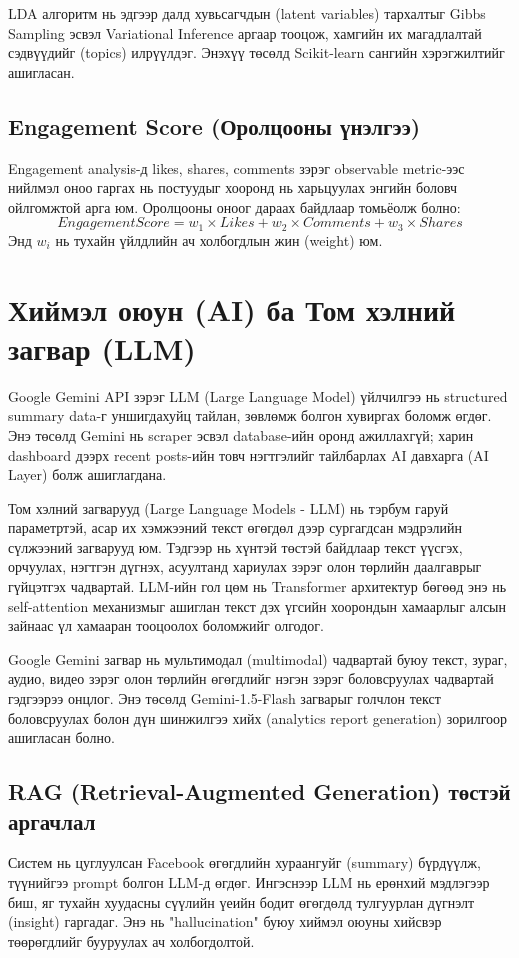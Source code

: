 LDA алгоритм нь эдгээр далд хувьсагчдын (latent variables) тархалтыг Gibbs Sampling эсвэл Variational Inference аргаар тооцож, хамгийн их магадлалтай сэдвүүдийг (topics) илрүүлдэг. Энэхүү төсөлд Scikit-learn сангийн хэрэгжилтийг ашигласан.

\subsection{Engagement Score (Оролцооны үнэлгээ)}
Engagement analysis-д likes, shares, comments зэрэг observable metric-ээс нийлмэл оноо гаргах нь постуудыг хооронд нь харьцуулах энгийн боловч ойлгомжтой арга юм. Оролцооны оноог дараах байдлаар томьёолж болно:
$$ Engagement Score = w_1 \times Likes + w_2 \times Comments + w_3 \times Shares $$
Энд $w_i$ нь тухайн үйлдлийн ач холбогдлын жин (weight) юм.

\section{Хиймэл оюун (AI) ба Том хэлний загвар (LLM)}

Google Gemini API зэрэг LLM (Large Language Model) үйлчилгээ нь structured summary data-г уншигдахуйц тайлан, зөвлөмж болгон хувиргах боломж өгдөг. Энэ төсөлд Gemini нь scraper эсвэл database-ийн оронд ажиллахгүй; харин dashboard дээрх recent posts-ийн товч нэгтгэлийг тайлбарлах AI давхарга (AI Layer) болж ашиглагдана.

Том хэлний загварууд (Large Language Models - LLM) нь тэрбум гаруй параметртэй, асар их хэмжээний текст өгөгдөл дээр сургагдсан мэдрэлийн сүлжээний загварууд юм. Тэдгээр нь хүнтэй төстэй байдлаар текст үүсгэх, орчуулах, нэгтгэн дүгнэх, асуултанд хариулах зэрэг олон төрлийн даалгаврыг гүйцэтгэх чадвартай. LLM-ийн гол цөм нь Transformer архитектур бөгөөд энэ нь self-attention механизмыг ашиглан текст дэх үгсийн хоорондын хамаарлыг алсын зайнаас үл хамааран тооцоолох боломжийг олгодог.

Google Gemini загвар нь мультимодал (multimodal) чадвартай буюу текст, зураг, аудио, видео зэрэг олон төрлийн өгөгдлийг нэгэн зэрэг боловсруулах чадвартай гэдгээрээ онцлог. Энэ төсөлд Gemini-1.5-Flash загварыг голчлон текст боловсруулах болон дүн шинжилгээ хийх (analytics report generation) зорилгоор ашигласан болно.

\subsection{RAG (Retrieval-Augmented Generation) төстэй аргачлал}
Систем нь цуглуулсан Facebook өгөгдлийн хураангуйг (summary) бүрдүүлж, түүнийгээ prompt болгон LLM-д өгдөг. Ингэснээр LLM нь ерөнхий мэдлэгээр биш, яг тухайн хуудасны сүүлийн үеийн бодит өгөгдөлд тулгуурлан дүгнэлт (insight) гаргадаг. Энэ нь "hallucination" буюу хиймэл оюуны хийсвэр төөрөгдлийг бууруулах ач холбогдолтой.

